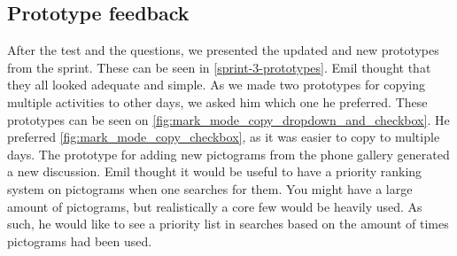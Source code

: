 \subsection{Prototype feedback}
After the test and the questions, we presented the updated and new prototypes from the sprint.
These can be seen in \autoref{sprint-3-prototypes}.
Emil thought that they all looked adequate and simple.
As we made two prototypes for copying multiple activities to other days, we asked him which one he preferred.
These prototypes can be seen on \autoref{fig:mark_mode_copy_dropdown_and_checkbox}.
He preferred \autoref{fig:mark_mode_copy_checkbox}, as it was easier to copy to multiple days.
The prototype for adding new pictograms from the phone gallery generated a new discussion.
Emil thought it would be useful to have a priority ranking system on pictograms when one searches for them.
You might have a large amount of pictograms, but realistically a core few would be heavily used. 
As such, he would like to see a priority list in searches based on the amount of times pictograms had been used.

